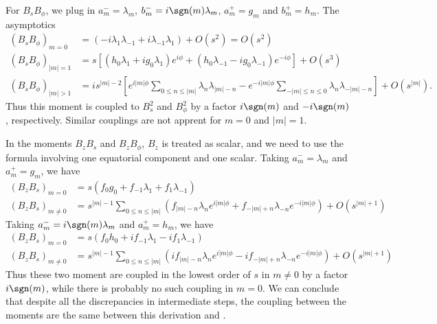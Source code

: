 For $B_s B_\phi$, we plug in $a_m^- = \lambda_m$, $b_m^- = i\sgn(m) \lambda_m$, $a_m^+ = g_m$ and $b_m^+ = h_m$. The asymptotics
\begin{equation}
    \begin{aligned}
        \left(B_s B_\phi\right)_{m=0} &= (-i\lambda_1 \lambda_{-1} + i\lambda_{-1} \lambda_1) + O\left(s^2\right) = O\left(s^2\right) \\ 
        \left(B_s B_\phi\right)_{|m|=1} &= s \left[\left(h_0 \lambda_1 + i g_0 \lambda_1\right) e^{i\phi} + \left(h_0 \lambda_{-1} - i g_0 \lambda_{-1}\right) e^{-i\phi}\right] + O\left(s^3\right) \\ 
        \left(B_s B_\phi\right)_{|m|>1} &= i s^{|m|-2} \left[e^{i|m|\phi} \sum_{0\leq n \leq |m|} \lambda_n \lambda_{|m|-n} - e^{-i|m|\phi} \sum_{-|m|\leq n\leq 0} \lambda_n \lambda_{-|m|-n}\right] + O\left(s^{|m|}\right).
    \end{aligned}
\end{equation}
Thus this moment is coupled to $B_s^2$ and $B_\phi^2$ by a factor $i\sgn(m)$ and $-i\sgn(m)$, respectively. Similar couplings are not apprent for $m=0$ and $|m|=1$.

In the moments $B_z B_s$ and $B_z B_\phi$, $B_z$ is treated as scalar, and we need to use the formula involving one equatorial component and one scalar. Taking $a_{m}^- = \lambda_m$ and $a_m^+ = g_m$, we have 
\begin{equation}
\begin{aligned}
    \left(B_z B_s\right)_{m=0} &= s \left(f_0 g_0 + f_{-1} \lambda_1 + f_1 \lambda_{-1}\right) \\ 
    \left(B_z B_s\right)_{m\neq 0} &= s^{|m|-1} \sum_{0\leq n\leq |m|}\left(f_{|m|-n} \lambda_n e^{i|m|\phi} + f_{-|m|+n} \lambda_{-n} e^{-i|m|\phi}\right) + O\left(s^{|m|+1}\right)
\end{aligned}
\end{equation}
Taking $a_m^- = i\sgn(m)\lambda_m$ and $a_m^+ = h_m$, we have
\begin{equation}
    \begin{aligned}
        \left(B_z B_s\right)_{m=0} &= s \left(f_0 h_0 + i f_{-1} \lambda_1 - i f_1 \lambda_{-1}\right) \\ 
        \left(B_z B_s\right)_{m\neq 0} &= s^{|m|-1} \sum_{0\leq n\leq |m|}\left(i f_{|m|-n} \lambda_n e^{i|m|\phi} - i f_{-|m|+n} \lambda_{-n} e^{-i|m|\phi}\right) + O\left(s^{|m|+1}\right)
    \end{aligned}
\end{equation}
Thus these two moment are coupled in the lowest order of $s$ in $m\neq 0$ by a factor $i\sgn(m)$, while there is probably no such coupling in $m=0$. We can conclude that despite all the discrepancies in intermediate steps, the coupling between the moments are the same between this derivation and \textcite{holdenried-chernoff_long_2021}.

